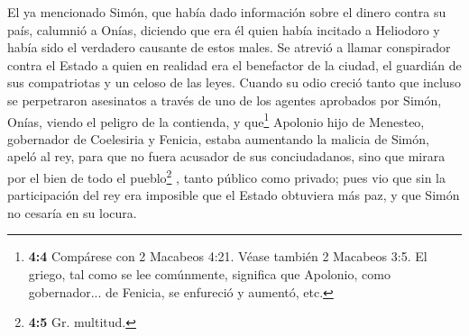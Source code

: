  El ya mencionado Simón, que había dado información sobre
el dinero contra su país, calumnió a Onías, diciendo que era él quien
había incitado a Heliodoro y había sido el verdadero causante de estos
males.  Se atrevió a llamar conspirador contra el Estado a
quien en realidad era el benefactor de la ciudad, el guardián de sus
compatriotas y un celoso de las leyes.  Cuando su odio
creció tanto que incluso se perpetraron asesinatos a través de uno de
los agentes aprobados por Simón,  Onías, viendo el peligro
de la contienda, y que\footnote{\textbf{4:4} Compárese con 2 Macabeos
  4:21. Véase también 2 Macabeos 3:5. El griego, tal como se lee
  comúnmente, significa que Apolonio, como gobernador... de Fenicia, se
  enfureció y aumentó, etc.} Apolonio hijo de Menesteo, gobernador de
Coelesiria y Fenicia, estaba aumentando la malicia de Simón,
 apeló al rey, para que no fuera acusador de sus
conciudadanos, sino que mirara por el bien de todo el pueblo\footnote{\textbf{4:5}
  Gr. multitud.} , tanto público como privado;  pues vio
que sin la participación del rey era imposible que el Estado obtuviera
más paz, y que Simón no cesaría en su locura.

